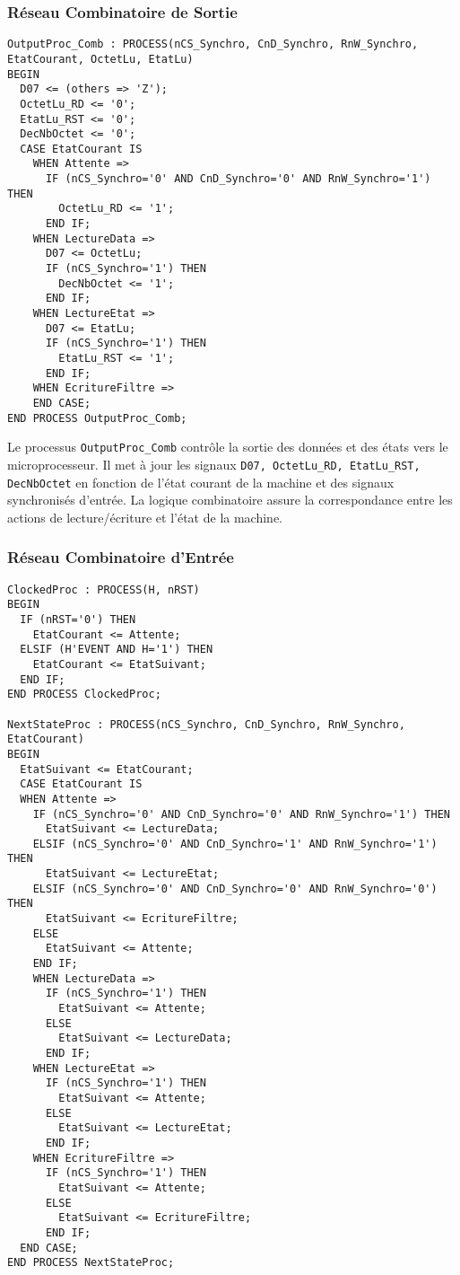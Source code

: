 \subsubsection{Réseau Combinatoire de Sortie}

\begin{lstlisting}[style=VHDLStyle, caption={Reseau Cominatoire de Sortie}]
OutputProc_Comb : PROCESS(nCS_Synchro, CnD_Synchro, RnW_Synchro, EtatCourant, OctetLu, EtatLu)
BEGIN
  D07 <= (others => 'Z');
  OctetLu_RD <= '0';
  EtatLu_RST <= '0';
  DecNbOctet <= '0';
  CASE EtatCourant IS
    WHEN Attente =>
      IF (nCS_Synchro='0' AND CnD_Synchro='0' AND RnW_Synchro='1') THEN
        OctetLu_RD <= '1';
      END IF;
    WHEN LectureData =>
      D07 <= OctetLu;
      IF (nCS_Synchro='1') THEN
        DecNbOctet <= '1';
      END IF;
    WHEN LectureEtat =>
      D07 <= EtatLu;
      IF (nCS_Synchro='1') THEN
        EtatLu_RST <= '1';
      END IF;
    WHEN EcritureFiltre =>   
    END CASE;
END PROCESS OutputProc_Comb;
\end{lstlisting}

Le processus \texttt{OutputProc\_Comb} contrôle la sortie des données et des états vers le microprocesseur. Il met à jour les signaux \texttt{D07, OctetLu\_RD, EtatLu\_RST, DecNbOctet} en fonction de l’état courant de la machine et des signaux synchronisés d’entrée. La logique combinatoire assure la correspondance entre les actions de lecture/écriture et l’état de la machine.

\subsubsection{Réseau Combinatoire d'Entrée}

\begin{lstlisting}[style=VHDLStyle, caption={Registres}]
ClockedProc : PROCESS(H, nRST)
BEGIN
  IF (nRST='0') THEN
    EtatCourant <= Attente;
  ELSIF (H'EVENT AND H='1') THEN
    EtatCourant <= EtatSuivant;
  END IF;
END PROCESS ClockedProc;

NextStateProc : PROCESS(nCS_Synchro, CnD_Synchro, RnW_Synchro, EtatCourant)
BEGIN
  EtatSuivant <= EtatCourant;
  CASE EtatCourant IS
  WHEN Attente =>
    IF (nCS_Synchro='0' AND CnD_Synchro='0' AND RnW_Synchro='1') THEN
      EtatSuivant <= LectureData;
    ELSIF (nCS_Synchro='0' AND CnD_Synchro='1' AND RnW_Synchro='1') THEN
      EtatSuivant <= LectureEtat;
    ELSIF (nCS_Synchro='0' AND CnD_Synchro='0' AND RnW_Synchro='0') THEN
      EtatSuivant <= EcritureFiltre;
    ELSE
      EtatSuivant <= Attente;
    END IF;
    WHEN LectureData =>
      IF (nCS_Synchro='1') THEN
        EtatSuivant <= Attente;
      ELSE
        EtatSuivant <= LectureData;
      END IF;
    WHEN LectureEtat =>
      IF (nCS_Synchro='1') THEN
        EtatSuivant <= Attente;
      ELSE
        EtatSuivant <= LectureEtat;
      END IF;
    WHEN EcritureFiltre =>
      IF (nCS_Synchro='1') THEN
        EtatSuivant <= Attente;
      ELSE 
        EtatSuivant <= EcritureFiltre;
      END IF;
  END CASE;
END PROCESS NextStateProc;
\end{lstlisting}

